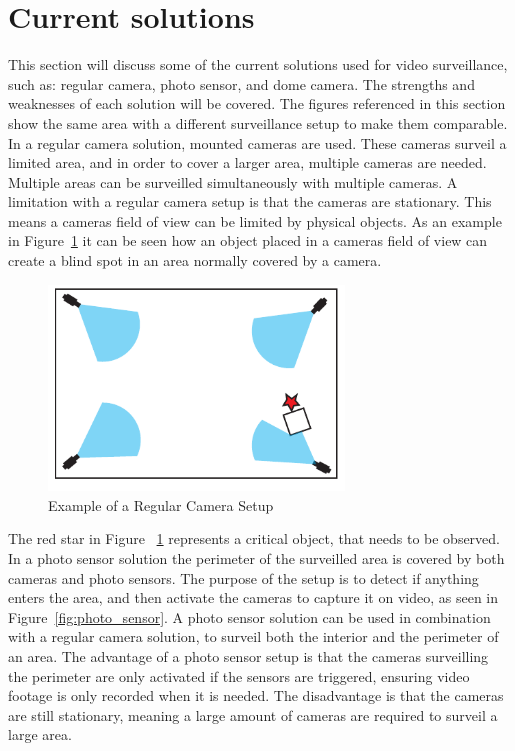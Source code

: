 \section{Current solutions}
This section will discuss some of the current solutions used for video surveillance, such as: regular camera, photo sensor, and dome camera.
The strengths and weaknesses of each solution will be covered.
The figures referenced in this section show the same area with a different surveillance setup to make them comparable. \\

In a regular camera solution, mounted cameras are used.
These cameras surveil a limited area, and in order to cover a larger area, multiple cameras are needed.
Multiple areas can be surveilled simultaneously with multiple cameras.
A limitation with a regular camera setup is that the cameras are stationary.
This means a cameras field of view can be limited by physical objects.
As an example in Figure~\ref{fig:refular_camera_setup} it can be seen how an object placed in a cameras field of view can create a blind spot in an area normally covered by a camera. \\

\begin{figure}[htb]
    \centering
    \includegraphics[width=0.7\textwidth]{gfx/regular_camera_setup.pdf}
    \caption{Example of a Regular Camera Setup}
    \label{fig:refular_camera_setup}
\end{figure}

The red star in Figure ~\ref{fig:refular_camera_setup} represents a critical object, that needs to be observed. \\

In a photo sensor solution the perimeter of the surveilled area is covered by both cameras and photo sensors.
The purpose of the setup is to detect if anything enters the area, and then activate the cameras to capture it on video, as seen in Figure~\ref{fig:photo_sensor}.
A photo sensor solution can be used in combination with a regular camera solution, to surveil both the interior and the perimeter of an area.
The advantage of a photo sensor setup is that the cameras surveilling the perimeter are only activated if the sensors are triggered, ensuring video footage is only recorded when it is needed.
The disadvantage is that the cameras are still stationary, meaning a large amount of cameras are required to surveil a large area. \\

